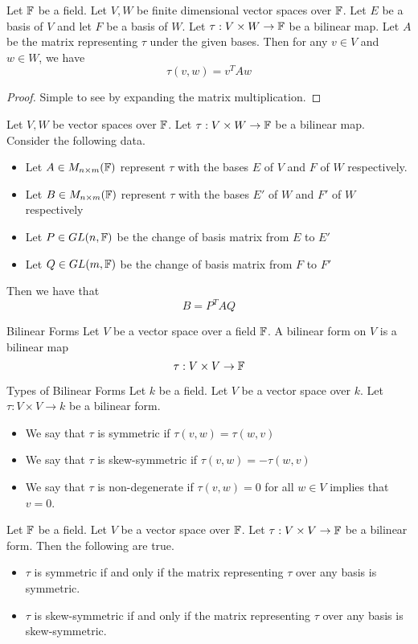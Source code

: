 \documentclass[a4paper]{article}
\begin{document}
\begin{prp}{}{} Let $\mathbb{F}$ be a field. Let $V,W$ be finite dimensional vector spaces over $\mathbb{F}$. Let $E$ be a basis of $V$ and let $F$ be a basis of $W$. Let $\tau:V\times W\to\mathbb{F}$ be a bilinear map. Let $A$ be the matrix representing $\tau$ under the given bases. Then for any $v\in V$ and $w\in W$, we have $$\tau(v,w)=v^TAw$$ 
\begin{proof}
Simple to see by expanding the matrix multiplication. 
\end{proof}
\end{prp}

\begin{prp}{}{} Let $V,W$ be vector spaces over $\mathbb{F}$. Let $\tau:V\times W\to\mathbb{F}$ be a bilinear map. Consider the following data. 
\begin{itemize}
\item Let $A\in M_{n\times m}(\mathbb{F})$ represent $\tau$ with the bases $E$ of $V$ and $F$ of $W$ respectively. 
\item Let $B\in M_{n\times m}(\mathbb{F})$ represent $\tau$ with the bases $E'$ of $W$ and $F'$ of $W$ respectively
\item Let $P\in GL(n,\mathbb{F})$ be the change of basis matrix from $E$ to $E'$
\item Let $Q\in GL(m,\mathbb{F})$ be the change of basis matrix from $F$ to $F'$
\end{itemize}
Then we have that $$B=P^TAQ$$
\end{prp}

\begin{defn}{Bilinear Forms}{} Let $V$ be a vector space over a field $\mathbb{F}$. A bilinear form on $V$ is a bilinear map $$\tau:V\times V\to\mathbb{F}$$
\end{defn}

\begin{defn}{Types of Bilinear Forms}{} Let $k$ be a field. Let $V$ be a vector space over $k$. Let $\tau:V\times V\to k$ be a bilinear form. 
\begin{itemize}
\item We say that $\tau$ is symmetric if $\tau(v,w)=\tau(w,v)$
\item We say that $\tau$ is skew-symmetric if $\tau(v,w)=-\tau(w,v)$
\item We say that $\tau$ is non-degenerate if $\tau(v,w)=0$ for all $w\in V$ implies that $v=0$. 
\end{itemize}
\end{defn}

\begin{prp}{}{} Let $\mathbb{F}$ be a field. Let $V$ be a vector space over $\mathbb{F}$. Let $\tau:V\times V\to\mathbb{F}$ be a bilinear form. Then the following are true. 
\begin{itemize}
\item $\tau$ is symmetric if and only if the matrix representing $\tau$ over any basis is symmetric. 
\item $\tau$ is skew-symmetric if and only if the matrix representing $\tau$ over any basis is skew-symmetric. 
\end{itemize}
\end{prp}
\end{document}
